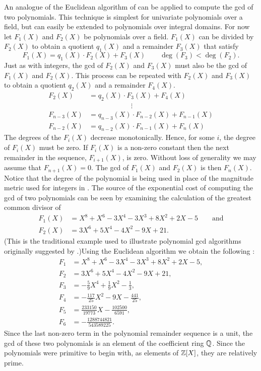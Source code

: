 An analogue of the Euclidean algorithm of
 can be applied to compute the {\sc gcd} of
two polynomials. This technique is simplest for univariate polynomials
over a field, but can easily be extended to polynomials over integral
domains.  For now let $F_1(X)$ and $F_2(X)$ be polynomials over a
field.  $F_1(X)$ can be divided by $F_2(X)$ to obtain a quotient
$q_1(X)$ and a remainder $F_3(X)$ that satisfy
\begin{equation}
F_1(X) = q_1(X)\cdot F_2(X) + F_3(X) \qquad \deg(F_3) < \deg(F_2).
\label{Poly:Remainder:Eq}
\end{equation}
Just as with integers, the {\sc gcd} of $F_2(X)$ and $F_3(X)$ must also be the
{\sc gcd} of $F_1(X)$ and $F_2(X)$. This process can be repeated with $F_2(X)$
and $F_3(X)$ to obtain a quotient $q_2(X)$ and a remainder $F_4(X)$. 
\[
\begin{aligned}
  F_2(X) &= q_2(X)\cdot F_3(X) + F_4(X) \\
     &\qquad\qquad\qquad\vdots\\
  F_{n-3}(X) &= q_{n-3}(X)\cdot F_{n-2}(X) + F_{n-1}(X)\\
  F_{n-2}(X) &= q_{n-2}(X)\cdot F_{n-1}(X) + F_{n}(X)
\end{aligned}
\]
The degrees of the $F_i(X)$ decrease monotonically.  Hence, for some
$i$, the degree of $F_i(X)$ must be zero.  If $F_i(X)$ is a non-zero
constant then the next remainder in the sequence, $F_{i+1}(X)$, is
zero.  Without loss of generality we may assume that $F_{n+1}(X) = 0$.
The {\sc gcd} of $F_1(X)$ and $F_2(X)$ is then $F_n(X)$.  Notice that
the degree of the polynomial is being used in place of the magnitude
metric used for integers in .  
The source of the exponential cost of computing the {\sc gcd} of two
polynomials can be seen by examining the calculation of the greatest
common divisor of
\[
\begin{aligned}
F_1(X)&= X^8 + X^6 - 3 X^4 - 3 X^3 + 8X^2 + 2X -5 
\qquad \mbox{and}\\
F_2(X)&= 3X^6 + 5X^4 - 4X^2 - 9X + 21.
\end{aligned}
\]
(This is the traditional example used to illustrate polynomial {\sc gcd}
algorithms originally suggested by {\Knuth} \cite{Knuth1997-tf}.)\enspace Using
the Euclidean algorithm we obtain the following :
\[
\begin{aligned}
  F_{1} & = X^8 + X^6 - 3 X^4 - 3 X^3 + 8X^2 + 2X -5, \\
  F_{2} & = 3X^6 + 5X^4 - 4X^2 - 9X + 21, \\
  F_{3} & = -\frac{5}{9}X^4 + \frac{1}{9}X^2 - \frac{1}{3}, \\
  F_{4} & = -\frac{117}{25}X^2 - 9 X - \frac{441}{25}, \\
  F_{5} & = \frac{233150}{19773}X - \frac{102500}{6591}, \\
  F_{6} & = -\frac{1288744821}{543589225}.
\end{aligned}
\]
Since the last non-zero term in the polynomial remainder sequence is a
unit, the {\sc gcd} of these two polynomials is an element of the coefficient
ring $\mathbb{Q}$.  Since the polynomials were primitive to begin with, as elements
of $\mathbb{Z}[X]$, they are relatively prime.

